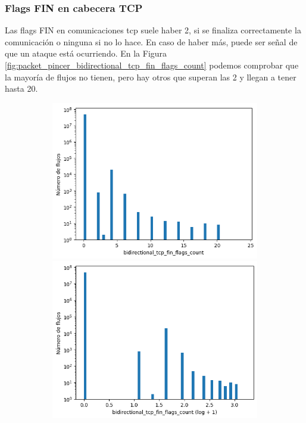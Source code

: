\subsubsection{Flags FIN en cabecera TCP}

Las flags FIN en comunicaciones \acrshort{tcp} suele haber 2, si se finaliza correctamente la comunicación o ninguna si no lo hace. En caso de haber más, puede ser señal de que un ataque está ocurriendo. En la Figura \ref{fig:packet_pincer_bidirectional_tcp_fin_flags_count} podemos comprobar que la mayoría de flujos no tienen, pero hay otros que superan las 2 y llegan a tener hasta 20.

\begin{figure}[H]
    \centering
    \begin{subfigure}[b]{0.32\textwidth}
        \centering
        \includegraphics[width=\textwidth]{media/packet_pincer_cicddos/bidirectional_tcp_fin_flags_count_linear_x_log_y.png}
        \includegraphics[width=\textwidth]{media/packet_pincer_cicddos/bidirectional_tcp_fin_flags_count_log_x_log_y.png}

\end{subfigure}
\end{figure}
